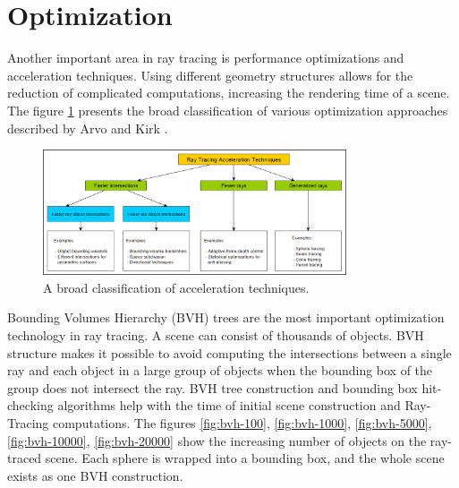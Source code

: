 \documentclass[12pt,a4paper,english]{article}
\begin{document}
\section{Optimization}

Another important area in ray tracing is performance optimizations and acceleration techniques. Using different geometry structures allows for the reduction of complicated computations, increasing the rendering time of a scene. The figure \ref{fig:acceleration-techniques} presents the broad classification of various optimization approaches described by Arvo and Kirk \cite{Arvo_Kirk_1989}.

\begin{figure}[H]
    \centering
    \includegraphics[width=0.8\textwidth]{acceleration-techniques}
    \caption[]{A broad classification of acceleration techniques.}
    \label{fig:acceleration-techniques}
\end{figure}

Bounding Volumes Hierarchy (BVH) trees are the most important optimization technology in ray tracing. A scene can consist of thousands of objects. BVH structure makes it possible to avoid computing the intersections between a single ray and each object in a large group of objects when the bounding box of the group does not intersect the ray. BVH tree construction and bounding box hit-checking algorithms help with the time of initial scene construction and Ray-Tracing computations. The figures \ref{fig:bvh-100}, \ref{fig:bvh-1000}, \ref{fig:bvh-5000}, \ref{fig:bvh-10000}, \ref{fig:bvh-20000} show the increasing number of objects on the ray-traced scene. Each sphere is wrapped into a bounding box, and the whole scene exists as one BVH construction.
\end{document}

